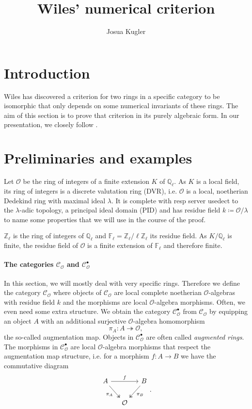 \documentclass{article}
\title{Wiles' numerical criterion}
\author{Josua Kugler}
\theoremstyle{plain}%
\theoremstyle{definition}
\theoremstyle{remark}
\newcommand{\cob}{\mathcal{C}_\mathcal{O}^\bullet}
\newcommand{\co}{\mathcal{C}_\mathcal{O}}
\begin{document}
\maketitle
\tableofcontents

\newpage
\section{Introduction}
Wiles has discovered a criterion for two rings in a specific category to be isomorphic 
that only depends on some numerical invariants of these rings. 
The aim of this section is to prove that criterion in its purely algebraic form. 
In our presentation, we closely follow \cite[5.1 - 5.8]{darmon1995fermat}.

\section{Preliminaries and examples}
Let \(\mathcal{O}\) be the ring of integers of a finite extension \(K\) of \(\mathbb Q_\ell\). 
As \(K\) is a local field, its ring of integers is a discrete valutation ring (DVR), i.e. 
\(\mathcal O\) is a local, noetherian Dedekind ring with maximal ideal \(\lambda\). 
It is complete with resp server usedect to the \(\lambda\)-adic topology, a principal ideal domain (PID) 
and has residue field \(k \coloneqq \mathcal{O}/\lambda\) 
to name some properties that we will use in the course of the proof.

\(\mathbb Z_\ell\) is the ring of integers of \(\mathbb Q_\ell\) and 
\(\mathbb F_\ell = \mathbb Z_\ell/\ell \mathbb Z_\ell\) its residue field. 
As \(K/\mathbb{Q}_\ell\) is finite, the residue field of \(\mathcal{O}\) 
is a finite extension of $\mathbb F_\ell$ and therefore finite. 

\paragraph{The categories \(\co\) and \(\cob\)}
In this section, we will mostly deal with very specific rings. 
Therefore we define the category \(\co\) where objects of \(\co\) are local complete noetherian \(\mathcal O\)-algebras 
with residue field \(k\) and the morphisms are local \(\mathcal{O}\)-algebra morphisms.
Often, we even need some extra structure. 
We obtain the category \(\cob\) from \(\co\) by equipping an object \(A\) 
with an additional surjective \(\mathcal{O}\)-algebra homomorphism
\[\pi_A \colon A \twoheadrightarrow \mathcal{O},\]
the so-called augmentation map. Objects in \(\cob\) are often called \textit{augmented rings}.
The morphisms in \(\cob\) are local \(\mathcal{O}\)-algebra morphisms that respect the augmentation map structure, 
i.e. for a morphism \(f \colon A \to B\) we have the commutative diagram
\[
\begin{tikzcd}[column sep=small]
    A \arrow[rr, "f"] \arrow [dr, "\pi_A", swap, twoheadrightarrow] & & B \arrow [dl, "\pi_B", twoheadrightarrow]\\
    & \mathcal{O} &
\end{tikzcd}.
\]
\end{document}
